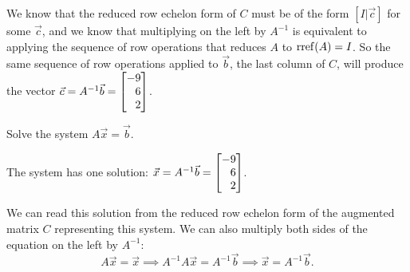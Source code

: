 \documentclass{workbook}
\begin{document}
\begin{slide}
\begin{parts}
\begin{solution}
				We know that the reduced row echelon form of $C$ must be of the
				form $[I|\vec c]$ for some $\vec c$, and we know that multiplying
				on the left by $A^{-1}$ is equivalent to applying the sequence of
				row operations that reduces $A$ to $\operatorname{rref}(A)=I$. So the same sequence
				of row operations applied to $\vec b$, the last column of $C$,
				will produce the vector $\vec c=A^{-1}\vec b=\mat{-9\\6\\2}$.
			\end{solution}

		\item Solve the system $A\vec x=\vec b$.
			\begin{solution}
				The system has one solution: $\vec x=A^{-1}\vec b=\mat{-9\\6\\2}$.

				We can read this solution from the reduced row echelon form of the
				augmented matrix $C$ representing this system. We can also multiply
				both sides of the equation on the left by $A^{-1}$:
				\[
					A\vec x=\vec x
					\implies A^{-1}A\vec x=A^{-1}\vec b
					\implies \vec x=A^{-1}\vec b.
				\]
			\end{solution}
	\end{parts}
\end{slide}
\end{document}
